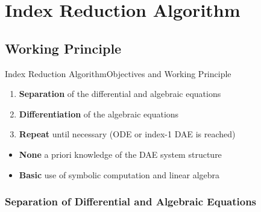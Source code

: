 
\section{Index Reduction Algorithm}

\subsection{Working Principle}

\begin{frame}{Index Reduction Algorithm}{Objectives and Working Principle}
  \begin{enumerate}
    \item \textbf{Separation} of the differential and algebraic equations
    \item \textbf{Differentiation} of the algebraic equations
    \item \textbf{Repeat} until necessary (\acs{ODE} or index-1 \acs{DAE} is reached)
  \end{enumerate}
  \vspace{1.0em}
  \begin{itemize}
    \item[\raisebox{-1pt}{\scalebox{0.8}{\faQuestion}}] \textbf{None} a priori knowledge of the \acs{DAE} system structure
    \item[\raisebox{-1pt}{\scalebox{0.8}{\faPaperPlane}}] \textbf{Basic} use of symbolic computation and linear algebra
  \end{itemize}
\end{frame}

\subsubsection{Separation of Differential and Algebraic Equations}

